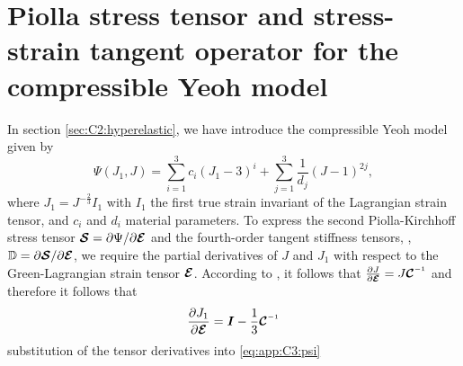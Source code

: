 \clearpage
\section{Piolla stress tensor and stress-strain tangent operator for the compressible Yeoh model}
\label{app:C3:yeohmodel}
In section \ref{sec:C2:hyperelastic}, we have introduce the compressible Yeoh model given by 
%
\begin{equation}
\Psi(J_1,J) = \sum_{i = 1}^{3} c_i (J_1 - 3)^i + \sum_{j = 1}^{3} \frac{1}{d_j} (J - 1)^{2j},
\label{eq:app:C3:psi}
\end{equation}
%
where $J_1 = J^{-\tfrac{2}{3}} I_1$ with $I_1$ the first true strain invariant of the Lagrangian strain tensor, and $c_i$ and $d_i$ material parameters. To express the second Piolla-Kirchhoff stress tensor $\boldsymbol{\mathcal{S}} = \partial \Psi/ \partial \boldsymbol{\mathcal{E}}$ and the fourth-order tangent stiffness tensors, \ie, $\mathbb{D} = \partial \boldsymbol{\mathcal{S}}/ \partial \boldsymbol{\mathcal{E}}$, we require the partial derivatives of $J$ and $J_1$ with respect to the Green-Lagrangian strain tensor $\boldsymbol{\mathcal{E}}$. According to \cite{Kim2018,Renaud2011}, it follows that $\tfrac{\p J}{\p \ten{E}} = J \ten{C}\inv$  and therefore it follows that
%
\begin{align}
\frac{\p J_1}{\p \ten{E}} = \IB - \frac{1}{3} \ten{C}\inv 
\end{align}
%
substitution of the tensor derivatives into \eqref{eq:app:C3:psi}